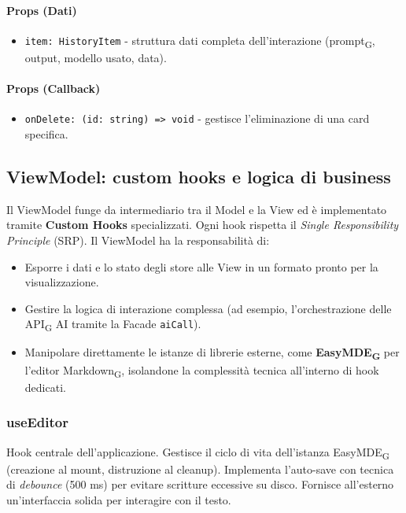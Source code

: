 \documentclass[11pt,a4paper]{article}
\newcommand{\gls}[1]{#1\textsubscript{G}}
\begin{document}
\paragraph{Props (Dati)}
\begin{itemize}
    \item \texttt{item: HistoryItem} - struttura dati completa dell'interazione (\gls{prompt}, output, modello usato, data).
\end{itemize}

\paragraph{Props (Callback)}
\begin{itemize}
    \item \texttt{onDelete: (id: string) => void} - gestisce l'eliminazione di una card specifica.
\end{itemize}


\newpage
\subsection{ViewModel: custom hooks e logica di business}
Il ViewModel funge da intermediario tra il Model e la View ed è implementato tramite \textbf{Custom Hooks} specializzati. Ogni hook rispetta il \textit{Single Responsibility Principle} (SRP).
Il ViewModel ha la responsabilità di:
\begin{itemize}
    \item Esporre i dati e lo stato degli store alle View in un formato pronto per la visualizzazione.
    \item Gestire la logica di interazione complessa (ad esempio, l'orchestrazione delle \gls{API} AI tramite la Facade \texttt{aiCall}).
    \item Manipolare direttamente le istanze di librerie esterne, come \textbf{\gls{EasyMDE}} per l'editor \gls{Markdown}, isolandone la complessità tecnica all'interno di hook dedicati.
\end{itemize}

\subsubsection{useEditor}
Hook centrale dell'applicazione. Gestisce il ciclo di vita dell'istanza \gls{EasyMDE} (creazione al mount, distruzione al cleanup). Implementa l'auto-save con tecnica di \textit{debounce} (500 ms) per evitare scritture eccessive su disco. Fornisce all'esterno un'interfaccia solida per interagire con il testo.
\end{document}
